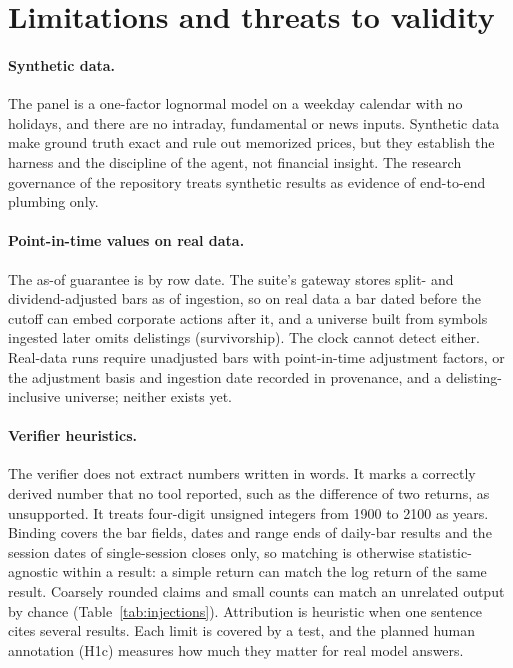 \section{Limitations and threats to validity}
\label{sec:limitations}

\paragraph{Synthetic data.} The panel is a one-factor lognormal model on a
weekday calendar with no holidays, and there are no intraday, fundamental or
news inputs. Synthetic data make ground truth exact and rule out memorized
prices, but they establish the harness and the discipline of the agent, not
financial insight. The research governance of the repository treats
synthetic results as evidence of end-to-end plumbing only.

\paragraph{Point-in-time values on real data.} The as-of guarantee is by row
date. The suite's gateway stores split- and dividend-adjusted bars as of
ingestion, so on real data a bar dated before the cutoff can embed corporate
actions after it, and a universe built from symbols ingested later omits
delistings (survivorship). The clock cannot detect either. Real-data runs
require unadjusted bars with point-in-time adjustment factors, or the
adjustment basis and ingestion date recorded in provenance, and a
delisting-inclusive universe; neither exists yet.

\paragraph{Verifier heuristics.} The verifier does not extract numbers written
in words. It marks a correctly derived number that no tool reported, such as
the difference of two returns, as unsupported. It treats four-digit unsigned
integers from 1900 to 2100 as years. Binding covers the bar fields, dates and
range ends of daily-bar results and the session dates of single-session
closes only, so matching is otherwise statistic-agnostic within a result: a simple return can match the log return
of the same result. Coarsely rounded claims and small counts can match an
unrelated output by chance (Table~\ref{tab:injections}). Attribution is
heuristic when one sentence cites several results. Each limit is covered by a
test, and the planned human annotation (H1c) measures how much they matter for
real model answers.

